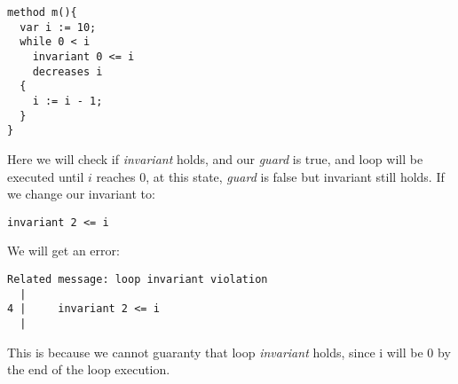\begin{lstlisting}[language=DafnyJS,caption={While loop },label={lst:loop}]
method m(){
  var i := 10;
  while 0 < i
    invariant 0 <= i
    decreases i
  {
    i := i - 1;
  }
}
\end{lstlisting}

Here we will check if \textit{invariant} holds, and our \textit{guard} is true, and loop will be executed until $i$ reaches $0$, at this state, \textit{guard} is false but invariant still holds. If we change our invariant to:

\begin{lstlisting}[language=DafnyJS,caption={Incorrect invariant},label={lst:loop}]
invariant 2 <= i
\end{lstlisting}

We will get an error:

\begin{lstlisting}[language=DafnyJS,caption={Error on loop invariant},label={lst:looperror}]
 Related message: loop invariant violation
  |
4 |     invariant 2 <= i
  |
\end{lstlisting}

This is because we cannot guaranty that loop \textit{invariant} holds, since i will be $0$ by the end of the loop execution.
